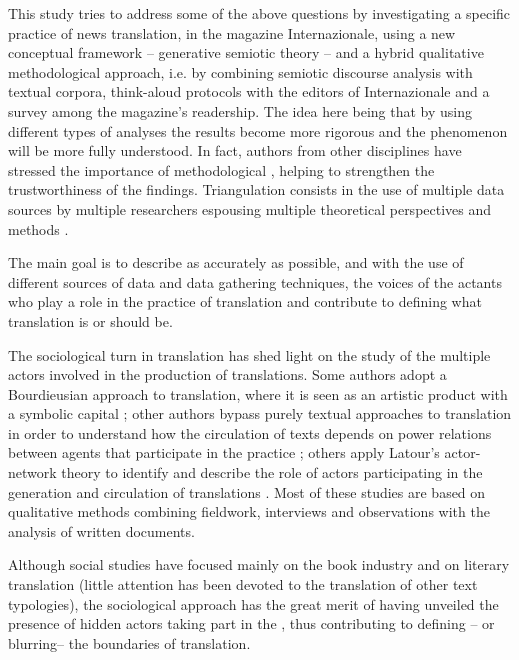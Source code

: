 \documentclass[output=paper]{LSP/langsci}
\begin{document}
This study tries to address some of the above questions by investigating a specific practice of news translation, in the  magazine Internazionale, using a new conceptual framework --  generative semiotic theory -- and a hybrid qualitative methodological approach, i.e. by combining semiotic discourse analysis with textual corpora, think-aloud protocols with the editors of Internazionale and a survey among the magazine's readership. The idea here being that by using different types of analyses the results become more rigorous and the phenomenon will be more fully understood. In fact, authors from other disciplines have stressed the importance of methodological , helping to strengthen the trustworthiness of the findings. Triangulation consists in the use of multiple data sources by multiple researchers espousing multiple theoretical perspectives and methods \citep{Leech2007, Jensen2008Credibility}. 

The main goal is to describe as accurately as possible, and with the use of different sources of data and data gathering techniques, the voices of the actants who play a role in the practice of translation and contribute to defining what translation is or should be. 

The sociological turn in translation has shed light on the study of the multiple actors involved in the production of translations. Some authors adopt a Bourdieusian approach to translation, where it is seen as an artistic product with a symbolic capital \citep{Inghilleri2005, Gouanvic2005, Gouanvic2007}; other authors bypass purely textual approaches to translation in order to understand how the circulation of texts depends on power relations between agents that participate in the practice \citep{Heilbron2002, Heilbron2007, Sapiro2008}; others apply Latour's actor-network theory to identify and describe the role of actors participating in the generation and circulation of translations \citep{Buzelin2005, Buzelin2006,Buzelin2007a,Buzelin2007b, Bogic2010}. Most of these studies are based on qualitative methods combining fieldwork, interviews and observations with the analysis of written documents.

Although social studies have focused mainly on the book industry and on literary translation (little attention has been devoted to the translation of other text typologies), the sociological approach has the great merit of having unveiled the presence of hidden actors taking part in the , thus contributing to defining -- or blurring-- the boundaries of translation. 
\end{document}
